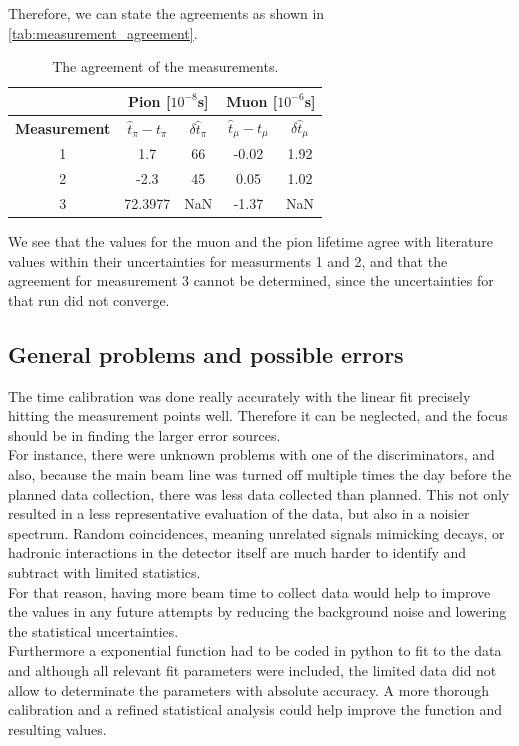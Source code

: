 \documentclass[11pt,a4paper]{article}
\begin{document}
Therefore, we can state the agreements as shown in \autoref{tab:measurement_agreement}.

\begin{table}[ht!]
\centering
\begin{tabular}{|c|c|c|c|c|}
\hline
&\multicolumn{2}{|c|}{\textbf{Pion [$10^{-8}$s]}} 
&\multicolumn{2}{|c|}{\textbf{Muon [$10^{-6}$s]}} \\
\hline
\textbf{Measurement} & \(\hat t_\pi - t_\pi\) & \(\delta \hat t_\pi\) & \(\hat t_\mu - t_\mu\) & \(\delta \hat t_\mu\) \\
\hline
1 & 1.7 & 66&-0.02&1.92 \\
2 &-2.3&45&0.05&1.02 \\
3 &72.3977&NaN&-1.37&NaN \\
\hline
\end{tabular}
    \caption{The agreement of the measurements.}
    \label{tab:measurement_agreement}
\end{table}

We see that the values for the muon and the pion lifetime agree with literature values within their uncertainties for measurments 1 and 2, and that the agreement for measurement 3 cannot be determined, since the uncertainties for that run did not converge. 



\subsection{General problems and possible errors}
The time calibration was done really accurately with the linear fit precisely hitting the measurement points well. Therefore it can be neglected, and the focus should be in finding the larger error sources. \\
For instance, there were unknown problems with one of the discriminators, and also, because
the main beam line was turned off multiple times the day before the planned data collection, there was less data collected than planned. 
This not only resulted in a less representative evaluation of the data, but also in a noisier spectrum. Random coincidences, meaning unrelated signals mimicking decays, or hadronic interactions in the detector itself are much harder to identify and subtract with limited statistics. \\
For that reason, having more beam time to collect data would help to improve the values in any future attempts by reducing the background noise and lowering the statistical uncertainties. \\ Furthermore a exponential function had to be coded in python to fit to the data and although all relevant fit parameters were included, the limited data did not allow to determinate the parameters with absolute accuracy. A more thorough calibration and a refined statistical analysis could help improve the function and resulting values.
\end{document}
